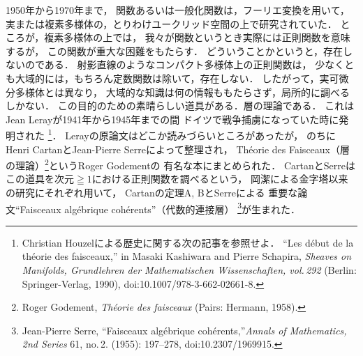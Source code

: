 \documentclass[9pt, a4paper, dvipdfmx]{jlreq}
\theoremstyle{definition}
\theoremstyle{mystyle}
\numberwithin{equation}{section} %
\begin{document}
1950年から1970年まで，
関数あるいは一般化関数は，フーリエ変換を用いて，
実または複素多様体の，とりわけユークリッド空間の上で研究されていた．
ところが，複素多様体の上では，
我々が関数というとき実際には正則関数を意味するが，
この関数が重大な困難をもたらす．
どういうことかというと，存在しないのである．
射影直線のようなコンパクト多様体上の正則関数は，
少なくとも大域的には，もちろん定数関数は除いて，存在しない．
したがって，実可微分多様体とは異なり，
大域的な知識は何の情報ももたらさず，局所的に調べるしかない．
この目的のための素晴らしい道具がある．層の理論である．
これはJean Lerayが1941年から1945年までの間
ドイツで戦争捕虜になっていた時に発明された
\footnote[3]{
    Christian Houzelによる歴史に関する次の記事を参照せよ．
    ``Les d\'ebut de la th\'eorie des faisceaux,'' in Masaki Kashiwara and Pierre Schapira, \textit{Sheaves on Manifolds, Grundlehren der Mathematischen Wissenschaften, vol.\,292} (Berlin: Springer-Verlag, 1990), doi:10.1007/978-3-662-02661-8.
}．
Lerayの原論文はどこか読みづらいところがあったが，
のちにHenri CartanとJean-Pierre Serreによって整理され，
Th\'eorie des Faisceaux（層の理論）\footnote[4]{
    Roger Godement, \textit{Th\'eorie des faisceaux} (Pairs: Hermann, 1958).
}というRoger Godementの
有名な本にまとめられた．
CartanとSerreはこの道具を次元$\geqq1$における正則関数を調べるという，
岡潔による金字塔以来の研究にそれぞれ用いて，
Cartanの定理A, BとSerreによる
重要な論文``Faisceaux alg\'ebrique coh\'erents''（代数的連接層）
\footnote[5]{
    Jean-Pierre Serre, ``Faisceaux alg\'ebrique coh\'erents,''\textit{Annals of Mathematics, 2nd Series} 61, no.\,2. (1955): 197--278, doi:10.2307/1969915.
}が生まれた．
\end{document}
